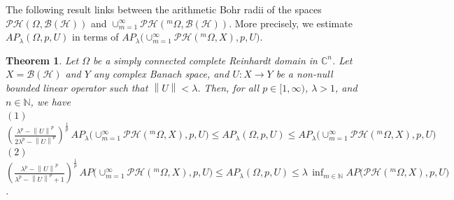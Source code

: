 \documentclass[a4paper,11pt, reqno]{amsart}
\newtheorem{thm}{Theorem}[section]
\theoremstyle{definition}
\newcommand{\norm}[1]{\left\lVert#1\right\rVert}
\begin{document}
The following result links between the arithmetic Bohr radii of the spaces $\mathcal{PH}(\Omega,\mathcal{B}(\mathcal{H}))$ and $\cup^{\infty}_{m=1} \mathcal{PH}(^m \Omega,\mathcal{B}(\mathcal{H}))$. More precisely, we estimate $AP_{\lambda}(\Omega, p,U)$ in terms of $AP_{\lambda}\big(\cup^{\infty}_{m=1} \mathcal{PH}(^m \Omega,X), p,U\big)$. 
\begin{thm} \label{tthm-1.8-atm}
	Let $\Omega$ be a simply connected complete Reinhardt domain in $\mathbb{C}^n$. Let $X=\mathcal{B}(\mathcal{H})$ and $Y$ any complex Banach space, and $U: X \rightarrow Y$ be a non-null bounded linear operator such that $\norm{U}< \lambda$. Then, for all $p\in[1,\infty)$, $\lambda>1$, and $n \in \mathbb{N}$, we have\\
	$(1)$ $\left(\frac{\lambda^p - \norm{U}^p}{2\lambda^p - \norm{U}^p}\right)^{\frac{1}{p}}\, AP_{\lambda}\big(\cup^{\infty}_{m=1} \mathcal{PH}(^m \Omega,X), p,U\big) \leq AP_{\lambda}(\Omega, p,U) \leq AP_{\lambda}\big(\cup^{\infty}_{m=1} \mathcal{PH}(^m \Omega,X), p,U\big)$ \\
	$(2)$ $\left(\frac{\lambda^p - \norm{U}^p}{\lambda^p - \norm{U}^p +1}\right)^{\frac{1}{p}}\, AP\big(\cup^{\infty}_{m=1} \mathcal{PH}(^m \Omega,X), p,U\big) \leq AP_{\lambda}(\Omega, p,U) \leq \lambda \, \inf_{m\in \mathbb{N}} AP\big( \mathcal{PH}(^m \Omega,X), p,U\big)$.
\end{thm}
\end{document}
